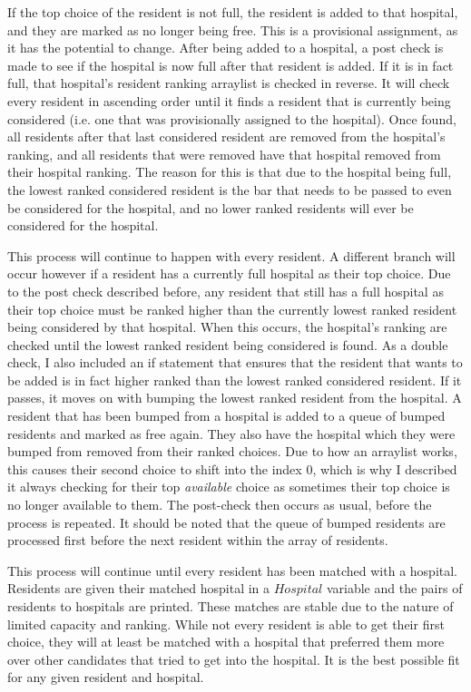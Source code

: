 \documentclass[letterpaper, 10pt,DIV=13]{scrartcl}
\numberwithin{equation}{section} %
\numberwithin{figure}{section} %
\numberwithin{table}{section} %
\begin{document}
If the top choice of the resident is not full, the resident is added to that hospital, and they are marked as no longer being free. This is a provisional assignment, as it has the potential to change. After being added to a hospital, a post check is made to see if the hospital is now full after that resident is added. If it is in fact full, that hospital's resident ranking arraylist is checked in reverse. It will check every resident in ascending order until it finds a resident that is currently being considered (i.e. one that was provisionally assigned to the hospital). Once found, all residents after that last considered resident are removed from the hospital's ranking, and all residents that were removed have that hospital removed from their hospital ranking. The reason for this is that due to the hospital being full, the lowest ranked considered resident is the bar that needs to be passed to even be considered for the hospital, and no lower ranked residents will ever be considered for the hospital.

This process will continue to happen with every resident. A different branch will occur however if a resident has a currently full hospital as their top choice. Due to the post check described before, any resident that still has a full hospital as their top choice must be ranked higher than the currently lowest ranked resident being considered by that hospital. When this occurs, the hospital's ranking are checked until the lowest ranked resident being considered is found. As a double check, I also included an if statement that ensures that the resident that wants to be added is in fact higher ranked than the lowest ranked considered resident. If it passes, it moves on with bumping the lowest ranked resident from the hospital. A resident that has been bumped from a hospital is added to a queue of bumped residents and marked as free again. They also have the hospital which they were bumped from removed from their ranked choices. Due to how an arraylist works, this causes their second choice to shift into the index 0, which is why I described it always checking for their top \textit{available} choice as sometimes their top choice is no longer available to them. The post-check then occurs as usual, before the process is repeated. It should be noted that the queue of bumped residents are processed first before the next resident within the array of residents.

This process will continue until every resident has been matched with a hospital. Residents are given their matched hospital in a $Hospital$ variable and the pairs of residents to hospitals are printed. These matches are stable due to the nature of limited capacity and ranking. While not every resident is able to get their first choice, they will at least be matched with a hospital that preferred them more over other candidates that tried to get into the hospital. It is the best possible fit for any given resident and hospital.
\end{document}

